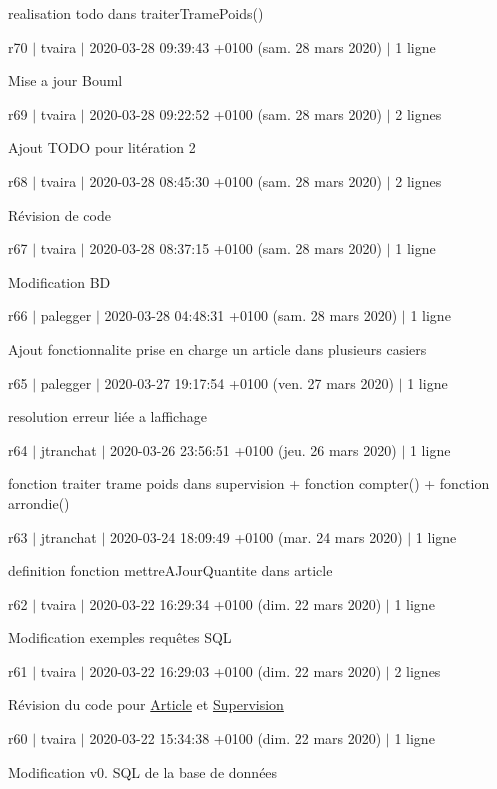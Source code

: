 realisation todo dans traiter\+Trame\+Poids()

r70 $\vert$ tvaira $\vert$ 2020-\/03-\/28 09\+:39\+:43 +0100 (sam. 28 mars 2020) $\vert$ 1 ligne

Mise a jour Bouml

r69 $\vert$ tvaira $\vert$ 2020-\/03-\/28 09\+:22\+:52 +0100 (sam. 28 mars 2020) $\vert$ 2 lignes

Ajout T\+O\+DO pour l\textquotesingle{}itération 2

r68 $\vert$ tvaira $\vert$ 2020-\/03-\/28 08\+:45\+:30 +0100 (sam. 28 mars 2020) $\vert$ 2 lignes

Révision de code

r67 $\vert$ tvaira $\vert$ 2020-\/03-\/28 08\+:37\+:15 +0100 (sam. 28 mars 2020) $\vert$ 1 ligne

Modification BD

r66 $\vert$ palegger $\vert$ 2020-\/03-\/28 04\+:48\+:31 +0100 (sam. 28 mars 2020) $\vert$ 1 ligne

Ajout fonctionnalite prise en charge un article dans plusieurs casiers

r65 $\vert$ palegger $\vert$ 2020-\/03-\/27 19\+:17\+:54 +0100 (ven. 27 mars 2020) $\vert$ 1 ligne

resolution erreur liée a l\textquotesingle{}affichage

r64 $\vert$ jtranchat $\vert$ 2020-\/03-\/26 23\+:56\+:51 +0100 (jeu. 26 mars 2020) $\vert$ 1 ligne

fonction traiter trame poids dans supervision + fonction compter() + fonction arrondie()

r63 $\vert$ jtranchat $\vert$ 2020-\/03-\/24 18\+:09\+:49 +0100 (mar. 24 mars 2020) $\vert$ 1 ligne

definition fonction mettre\+A\+Jour\+Quantite dans article

r62 $\vert$ tvaira $\vert$ 2020-\/03-\/22 16\+:29\+:34 +0100 (dim. 22 mars 2020) $\vert$ 1 ligne

Modification exemples requêtes S\+QL

r61 $\vert$ tvaira $\vert$ 2020-\/03-\/22 16\+:29\+:03 +0100 (dim. 22 mars 2020) $\vert$ 2 lignes

Révision du code pour \hyperlink{class_article}{Article} et \hyperlink{class_supervision}{Supervision}

r60 $\vert$ tvaira $\vert$ 2020-\/03-\/22 15\+:34\+:38 +0100 (dim. 22 mars 2020) $\vert$ 1 ligne

Modification v0. S\+QL de la base de données

